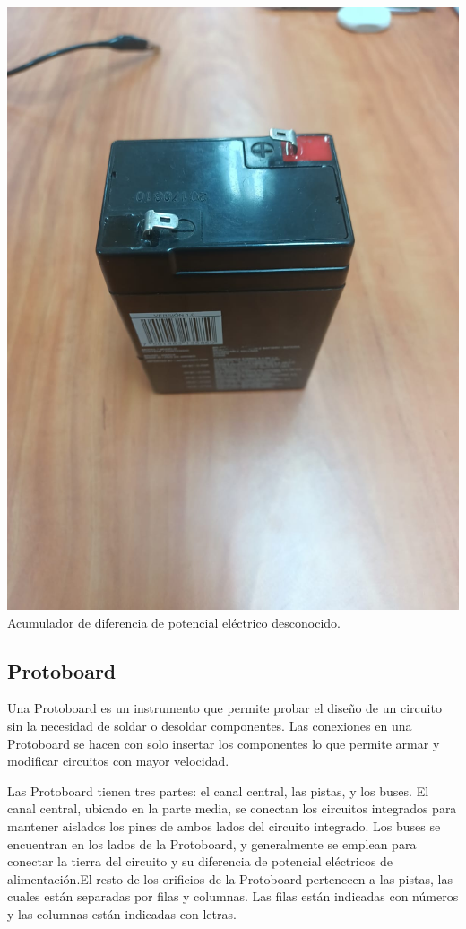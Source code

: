 \documentclass[10pt]{article}
\begin{document}
\begin{multicols}{2}
\begin{center}
	\includegraphics[scale = 0.1]{Imagenes/Material/PilaDes.jpeg}\\
	Acumulador de diferencia de potencial eléctrico desconocido.\\
\end{center}

\subsection{Protoboard}

Una Protoboard es un instrumento que permite probar el diseño de un circuito sin la necesidad de soldar o desoldar componentes. Las conexiones en una Protoboard se hacen con solo insertar los componentes lo que permite armar y modificar circuitos con mayor velocidad.

Las Protoboard tienen tres partes: el canal central, las pistas, y los buses. El canal central, ubicado en la parte media, se conectan los circuitos integrados para mantener aislados los pines de ambos lados del circuito integrado. Los buses se encuentran en los lados de la Protoboard, y generalmente se emplean para conectar la tierra del circuito y su diferencia de potencial eléctricos de alimentación.El resto de los orificios de la Protoboard pertenecen a las pistas, las cuales están separadas por filas y columnas. Las filas están indicadas con números y las columnas están indicadas con letras.


\end{multicols}
\end{document}
